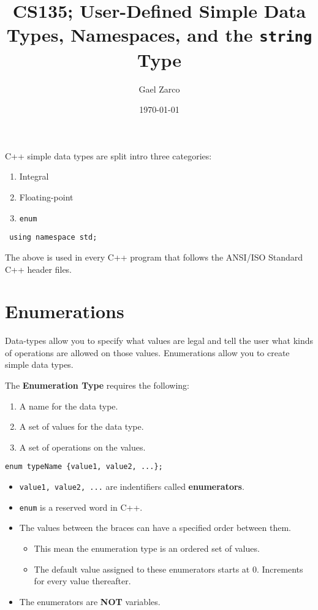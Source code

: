 \documentclass{article}
\title{CS135; User-Defined Simple Data Types, Namespaces, and the
\texttt{string} Type}
\author{Gael Zarco}
\date{\today}
\begin{document}
\maketitle

C++ simple data types are split intro three categories:
\begin{enumerate}
  \item Integral
  \item Floating-point
  \item \texttt{enum}
\end{enumerate}

\begin{lstlisting}
 using namespace std;
\end{lstlisting}
The above is used in every C++ program that follows the ANSI/ISO Standard C++
header files.

\section{Enumerations}
Data-types allow you to specify what values are legal and tell the user what
kinds of operations are allowed on those values. Enumerations allow you to
create simple data types.

\vspace{8pt}
The \textbf{Enumeration Type} requires the following:
\begin{enumerate}
  \item A name for the data type.
  \item A set of values for the data type.
  \item A set of operations on the values.
\end{enumerate}

\begin{lstlisting}[caption={Enumeration Syntax}]
  enum typeName {value1, value2, ...};
\end{lstlisting}

\begin{itemize}
  \item \texttt{value1, value2, ...} are indentifiers called
    \textbf{enumerators}.
  \item \texttt{enum} is a reserved word in C++.
  \item The values between the braces can have a specified order between them.
    \begin{itemize}
      \item This mean the enumeration type is an ordered set of values.
      \item The default value assigned to these enumerators starts at 0.
        Increments for every value thereafter.
    \end{itemize}
  \item The enumerators are \textbf{NOT} variables.
\end{itemize}
\end{document}
